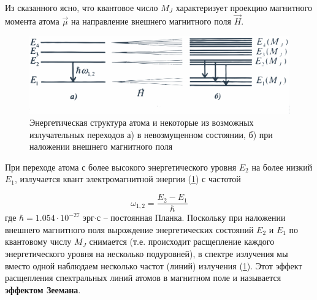 Из сказанного ясно, что квантовое число $M_J$ характеризует проекцию магнитного момента атома $\vec{\mu}$ на направление внешнего магнитного поля $\vec{H}$.

\begin{figure}[tb]
	\centering
	\includegraphics[width=\linewidth]{fig/fig1}
	\caption{Энергетическая структура атома и некоторые из возможных излучательных переходов
	а) в невозмущенном состоянии, б) при наложении внешнего магнитного поля}
	\label{fig:1}
\end{figure}

При переходе атома с более высокого энергетического уровня $E_2$ на более низкий $E_1$, излучается квант электромагнитной энергии (\ref{fig:1}) с частотой

\begin{equation}
\omega_{1,2}=\frac{E_2-E_1}{\hbar}
\label{eq:3}
\end{equation}
где $\hbar = 1.054\cdot10^{-27}$ эрг$\cdot$с -- постоянная Планка. Поскольку при наложении внешнего магнитного поля вырождение энергетических состояний $E_2$ и $E_1$ по квантовому числу $M_J$ снимается (т.е. происходит расщепление каждого энергетического уровня на несколько подуровней), в спектре излучения мы вместо одной наблюдаем несколько частот (линий) излучения (\ref{fig:1}). Этот эффект расщепления спектральных линий атомов в магнитном поле и называется \textbf{эффектом Зеемана}.
